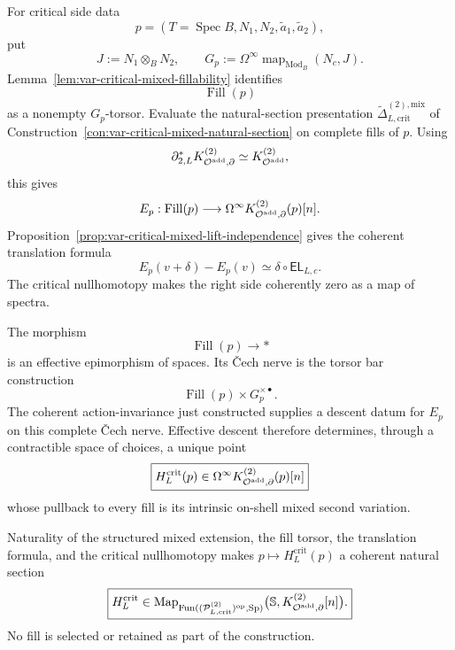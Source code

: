 \begin{construction}
\label{con:var-critical-hessian-section}
For critical side data
\[
    p=(T=\operatorname{Spec}B,N_1,N_2,\widetilde a_1,\widetilde a_2),
\]
put
\[
    J:=N_1\otimes_BN_2,
    \qquad
    G_p:=
    \Omega^\infty
    \operatorname{map}_{\operatorname{Mod}_B}(N_c,J).
\]
Lemma~\ref{lem:var-critical-mixed-fillability} identifies
\[
    \operatorname{Fill}(p)
\]
as a nonempty \(G_p\)-torsor.  Evaluate the natural-section presentation
\(\widetilde\Delta_{L,\mathrm{crit}}^{(2),\mathrm{mix}}\) of Construction~\ref{con:var-critical-mixed-natural-section} on complete fills of \(p\).  Using
\[
    \partial_{2,L}^*K^{(2)}_{\mathcal O^{\mathrm{add}},\partial}
    \simeq
    K_{\mathcal O^{\mathrm{add}}}^{(2)},
\]
this gives
\[
    E_p:
    \operatorname{Fill}(p)
    \longrightarrow
    \Omega^\infty K^{(2)}_{\mathcal O^{\mathrm{add}},\partial}(p)[n].
\]
Proposition~\ref{prop:var-critical-mixed-lift-independence} gives the coherent translation formula
\[
    E_p(v+\delta)-E_p(v)
    \simeq
    \delta\circ\mathsf{EL}_{L,c}.
\]
The critical nullhomotopy makes the right side coherently zero as a map of spectra.

The morphism
\[
    \operatorname{Fill}(p)\longrightarrow *
\]
is an effective epimorphism of spaces.  Its \v{C}ech nerve is the torsor bar construction
\[
    \operatorname{Fill}(p)\times G_p^{\times\bullet}.
\]
The coherent action-invariance just constructed supplies a descent datum for \(E_p\) on this complete \v{C}ech nerve.  Effective descent therefore determines, through a contractible space of choices, a unique point
\[
    \boxed{
    H_L^{\mathrm{crit}}(p)
    \in
    \Omega^\infty K^{(2)}_{\mathcal O^{\mathrm{add}},\partial}(p)[n]
    }
\]
whose pullback to every fill is its intrinsic on-shell mixed second variation.

Naturality of the structured mixed extension, the fill torsor, the translation formula, and the critical nullhomotopy makes
\(p\mapsto H_L^{\mathrm{crit}}(p)\) a coherent natural section
\[
    \boxed{
    H_L^{\mathrm{crit}}
    \in
    \operatorname{Map}_{\operatorname{Fun}((\mathcal P^{(2)}_{L,\mathrm{crit}})^{\mathrm{op}},\operatorname{Sp})}
    \bigl(
      \mathbb S,
      K^{(2)}_{\mathcal O^{\mathrm{add}},\partial}[n]
    \bigr).
    }
\]
No fill is selected or retained as part of the construction.
\end{construction}

